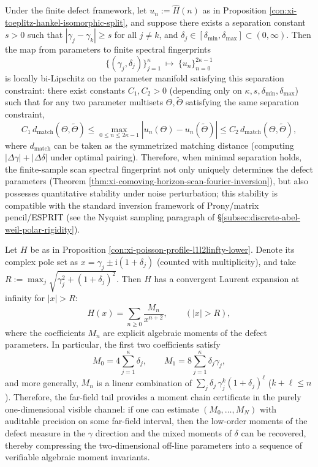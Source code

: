 \begin{proposition}\label{con:xi-min-separation-bilip-prony}
Under the finite defect framework, let \(u_n:=\widehat H(n)\) as in Proposition \ref{con:xi-toeplitz-hankel-isomorphic-split}, and suppose there exists a separation constant \(s>0\) such that
\(
|\gamma_j-\gamma_k|\ge s
\)
for all \(j\neq k\), and \(\delta_j\in[\delta_{\min},\delta_{\max}]\subset(0,\infty)\).
Then the map from parameters to finite spectral fingerprints
\[
\{(\gamma_j,\delta_j)\}_{j=1}^{\kappa}\ \longmapsto\ \{u_n\}_{n=0}^{2\kappa-1}
\]
is locally bi-Lipschitz on the parameter manifold satisfying this separation constraint:
there exist constants \(C_1,C_2>0\) (depending only on \(\kappa,s,\delta_{\min},\delta_{\max}\)) such that for any two parameter multisets \(\Theta,\widetilde\Theta\) satisfying the same separation constraint,
\[
C_1\,d_{\mathrm{match}}(\Theta,\widetilde\Theta)
\le
\max_{0\le n\le 2\kappa-1}|u_n(\Theta)-u_n(\widetilde\Theta)|
\le
C_2\,d_{\mathrm{match}}(\Theta,\widetilde\Theta),
\]
where \(d_{\mathrm{match}}\) can be taken as the symmetrized matching distance (computing \(|\Delta\gamma|+|\Delta\delta|\) under optimal pairing).
Therefore, when minimal separation holds, the finite-sample scan spectral fingerprint not only uniquely determines the defect parameters (Theorem \ref{thm:xi-comoving-horizon-scan-fourier-inversion}), but also possesses quantitative stability under noise perturbation; this stability is compatible with the standard inversion framework of Prony/matrix pencil/ESPRIT (see the Nyquist sampling paragraph of \S\ref{subsec:discrete-abel-weil-polar-rigidity}).
\end{proposition}

\begin{proposition}\label{con:xi-farfield-moment-chain}
Let \(H\) be as in Proposition \ref{con:xi-poisson-profile-l1l2linfty-lower}.
Denote its complex pole set as
\(
x=\gamma_j\pm \mathrm{i}(1+\delta_j)
\)
(counted with multiplicity), and take
\(
R:=\max_j\sqrt{\gamma_j^2+(1+\delta_j)^2}.
\)
Then \(H\) has a convergent Laurent expansion at infinity for \(|x|>R\):
\[
H(x)=\sum_{n\ge 0}\frac{M_n}{x^{n+2}},
\qquad (|x|>R),
\]
where the coefficients \(M_n\) are explicit algebraic moments of the defect parameters.
In particular, the first two coefficients satisfy
\[
M_0=4\sum_{j=1}^{\kappa}\delta_j,
\qquad
M_1=8\sum_{j=1}^{\kappa}\delta_j\gamma_j,
\]
and more generally, \(M_n\) is a linear combination of \(\sum_j \delta_j\,\gamma_j^{k}(1+\delta_j)^{\ell}\) (\(k+\ell\le n\)).
Therefore, the far-field tail provides a moment chain certificate in the purely one-dimensional visible channel: if one can estimate \((M_0,\dots,M_N)\) with auditable precision on some far-field interval, then the low-order moments of the defect measure in the \(\gamma\) direction and the mixed moments of \(\delta\) can be recovered, thereby compressing the two-dimensional off-line parameters into a sequence of verifiable algebraic moment invariants.
\end{proposition}

